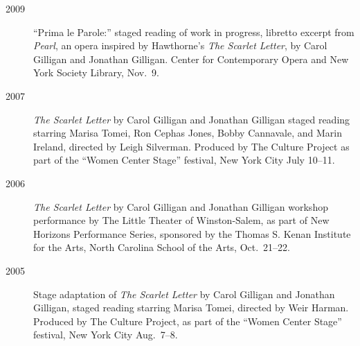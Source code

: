 \begin{description}
\item[2009] ``Prima le Parole:'' staged reading of work in progress, libretto excerpt from \emph{Pearl}, an opera inspired by Hawthorne's \emph{The Scarlet Letter}, by Carol Gilligan and Jonathan Gilligan. Center for Contemporary Opera and New York Society Library, Nov.~9.
\item[2007] \emph{The Scarlet Letter\/} by Carol Gilligan and Jonathan Gilligan staged reading starring Marisa Tomei, Ron Cephas Jones, Bobby Cannavale, and Marin Ireland, directed by Leigh Silverman. Produced by The Culture Project as part of the ``Women Center Stage'' festival, New York City July 10--11.
\item[2006] \emph{The Scarlet Letter\/} by Carol Gilligan and Jonathan Gilligan workshop performance by The Little Theater of Winston-Salem, as part of New Horizons Performance Series, sponsored by the Thomas S. Kenan Institute for the Arts, North Carolina School of the Arts, Oct.~21--22.
\item[2005] Stage adaptation of \emph{The Scarlet Letter\/} by Carol Gilligan and Jonathan Gilligan, staged reading starring Marisa Tomei, directed by Weir Harman. Produced by The Culture Project, as part of the ``Women Center Stage'' festival, New York City Aug.\ 7--8.
\end{description}